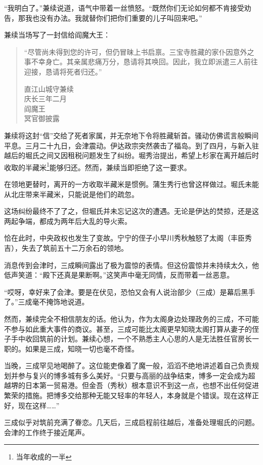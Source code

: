 \documentclass[
]{book}
\begin{document}
``我明白了。''兼续说道，语气中带着一丝愤怒。``既然你们无论如何都不肯接受劝告，那我也没有办法。我就替你们把你们重要的儿子叫回来吧。''

兼续当场写了一封信给阎魔大王：

\begin{quote}
``尽管尚未得到您的许可，但仍冒昧上书启禀。三宝寺胜藏的家仆因意外之事不幸身亡。其亲属悲痛万分，恳请将其唤回。因此，我立即派遣三人前往迎接，恳请将死者归还。''

直江山城守兼续\\
庆长三年二月\\
阎魔王\\
冥官御披露
\end{quote}

兼续将这封``信''交给了死者家属，并无奈地下令将胜藏斩首。骚动仿佛谎言般瞬间平息。三月二十九日，会津震动。伊达政宗突然袭击了福岛。到了四月，与新入驻越后的堀氏之间又因租税问题发生了纠纷。堀秀治提出，希望上杉家在离开越后时收取的半藏米\footnote{当年收成的一半}能够归还。然而，兼续当即拒绝了这一要求。

在领地更替时，离开的一方收取半藏米是惯例。蒲生秀行也曾这样做过。堀氏未能从北庄带来半藏米，只能说是他们的疏忽。

这场纠纷最终不了了之，但堀氏并未忘记这次的遭遇。无论是伊达的焚掠，还是这两起争端，都成为两年后大乱的导火索。

恰在此时，中央政权也发生了变故。宁宁的侄子小早川秀秋触怒了太阁（丰臣秀吉），失去了筑前五十二万余石的领地。

消息传到会津时，三成瞬间露出了极为震惊的表情。但这份震惊并未持续太久，他低声笑道：``殿下还真是果断啊。''这笑声中毫无同情，反而带着一丝恶意。

``哎呀，幸好来了会津。要是在伏见，恐怕又会有人说治部少（三成）是幕后黑手了。''三成毫不掩饰地说道。

然而，兼续完全不相信朋友的话。他认为，作为太阁身边处理政务的三成，不可能不参与如此重大事件的商议。甚至，三成可能比太阁更早知晓太阁打算从妻子的侄子手中收回筑前的计划。兼续心想，一个不熟悉主人心思的人是无法胜任官房长一职的。如果是三成，知晓一切也毫不奇怪。

当晚，三成罕见地喝醉了。这位能吏像着了魔一般，滔滔不绝地讲述着自己负责规划并参与复兴的博多城有多么美好。``只要与高丽的战争结束，博多一定会成为超越堺的日本第一贸易港。但金吾（秀秋）根本意识不到这一点，也想不出任何促进繁荣的措施。把博多交给那种无能又轻率的年轻人，本身就是个错误。现在这样正好，现在这样\ldots\ldots{}''

三成似乎对筑前充满了眷恋。几天后，三成启程前往越后，准备处理堀氏的问题。会津的工作终于接近尾声。
\end{document}
